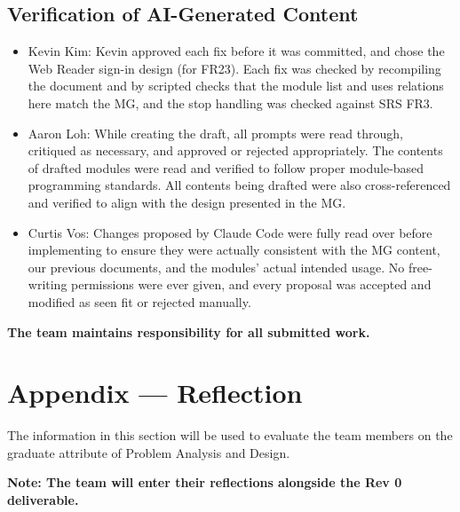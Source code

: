 \documentclass[12pt, titlepage]{article}
\begin{document}
\subsection{Verification of AI-Generated Content}
\begin{itemize}
\item Kevin Kim: Kevin approved each fix before it was committed, and chose the Web Reader
sign-in design (for FR23). Each fix was checked by recompiling the document and
by scripted checks that the module list and uses relations here match the MG,
and the stop handling was checked against SRS FR3.
\item Aaron Loh: While creating the draft, all prompts were read through, critiqued as necessary, and approved or rejected appropriately.
The contents of drafted modules were read and verified to follow proper module-based programming standards. All contents being drafted were also
cross-referenced and verified to align with the design presented in the MG.
\item Curtis Vos: Changes proposed by Claude Code were fully read over before implementing to ensure they were actually consistent with the
MG content, our previous documents, and the modules' actual intended usage. No free-writing permissions were ever given, and every proposal was 
accepted and modified as seen fit or rejected manually.
\end{itemize}

\textbf{The team maintains responsibility for all submitted work.}

\newpage

\section{Appendix --- Reflection}

The information in this section will be used to evaluate the team members on the
graduate attribute of Problem Analysis and Design. 





\textbf{Note: The team will enter their reflections alongside the Rev 0 deliverable.}
\end{document}
